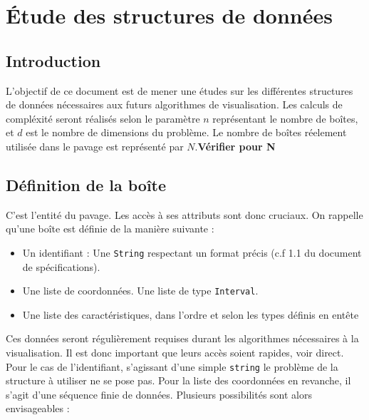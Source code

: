 \chapter{Étude des structures de données}







\section{Introduction}
L'objectif de ce document est de mener une études sur les différentes structures de données nécessaires aux futurs algorithmes de visualisation. Les calculs de compléxité seront réalisés selon le paramètre $n$  représentant le nombre de boîtes, et $d$ est le nombre de dimensions du problème. Le nombre de boîtes réelement utilisée dans le pavage est représenté par $N$.\textbf{Vérifier pour N}


\section{Définition de la boîte}
C'est l'entité du pavage. Les accès à ses attributs sont donc cruciaux. On rappelle qu'une boîte est définie de la manière suivante : 
\begin{itemize}
\item 
  Un identifiant : Une \verb+String+ respectant un format précis (c.f 1.1 du document de spécifications).
\item
  Une liste de coordonnées. Une liste de type \verb+Interval+.
\item
  Une liste des caractéristiques, dans l'ordre et selon les types définis en entête
\end{itemize}
Ces données seront régulièrement requises durant les algorithmes nécessaires à la visualisation. Il est donc important que leurs accès soient rapides, voir direct. Pour le cas de l'identifiant, s'agissant d'une simple \verb+string+ le problème de la structure à utiliser ne se pose pas. Pour la liste des coordonnées en revanche, il s'agit d'une séquence finie de données. Plusieurs possibilités sont alors envisageables : 

